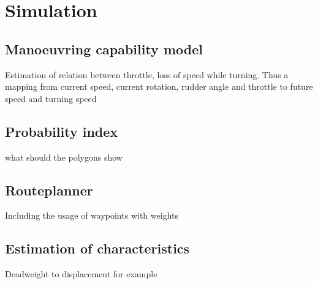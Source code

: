 \chapter{Simulation}

\section{Manoeuvring capability model}
Estimation of relation between throttle, loss of speed while turning. Thus a mapping from current speed, current rotation, rudder angle and throttle to future speed and turning speed

\section{Probability index}
what should the polygons show

\section{Routeplanner}
Including the usage of waypoints with weights

\section{Estimation of characteristics}
Deadweight to displacement for example

